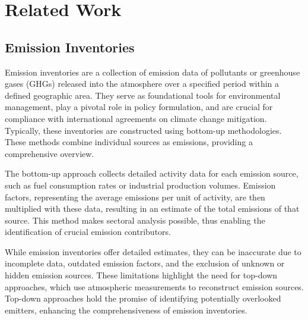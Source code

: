
\chapter{Related Work}\label{chapter:related_work}

\section{Emission Inventories}
Emission inventories are a collection of emission data of pollutants or greenhouse gases (GHGs) released into the atmosphere over a specified period within a defined geographic area.
They serve as foundational tools for environmental management, play a pivotal role in policy formulation, and are crucial for compliance with international agreements on climate change mitigation.
Typically, these inventories are constructed using bottom-up methodologies.
These methods combine individual sources as emissions, providing a comprehensive overview.

The bottom-up approach collects detailed activity data for each emission source, such as fuel consumption rates or industrial production volumes.
Emission factors, representing the average emissions per unit of activity, are then multiplied with these data, resulting in an estimate of the total emissions of that source.
This method makes sectoral analysis possible, thus enabling the identification of crucial emission contributors.

While emission inventories offer detailed estimates, they can be inaccurate due to incomplete data, outdated emission factors, and the exclusion of unknown or hidden emission sources.
These limitations highlight the need for top-down approaches, which use atmospheric measurements to reconstruct emission sources.
Top-down approaches hold the promise of identifying potentially overlooked emitters, enhancing the comprehensiveness of emission inventories.


